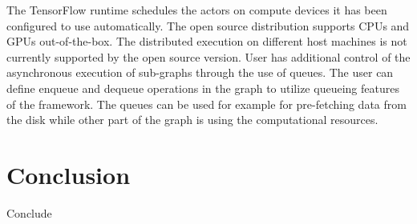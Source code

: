 \documentclass[conference,a4paper]{IEEEtran}
\begin{document}
The TensorFlow runtime schedules the actors on compute devices it has been
configured to use automatically. The open source distribution supports CPUs and
GPUs out-of-the-box. The distributed execution on different host machines is not
currently supported by the open source version. User has additional control of
the asynchronous execution of sub-graphs through the use of queues. The user can
define enqueue and dequeue operations in the graph to utilize queueing features
of the framework. The queues can be used for example for pre-fetching data from
the disk while other part of the graph is using the computational resources.
\cite{tensorflow2015-whitepaper}

\section{Conclusion}
Conclude \\



\end{document}

